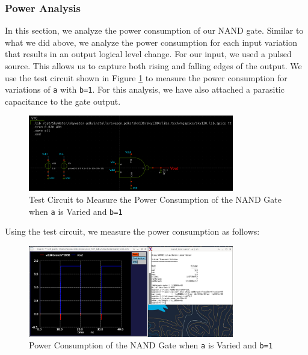 \documentclass[fleqn]{article}
\begin{document}
	\subsubsection{Power Analysis}
	
	In this section, we analyze the power consumption of our NAND gate. Similar to what we did above, we analyze the power consumption for each input variation that results in an output logical level change. For our input, we used a pulsed source. This allows us to capture both rising and falling edges of the output. We use the test circuit shown in Figure \ref{fig::nand_power_test_sweep_va} to measure the power consumption for variations of \texttt{a} with \texttt{b=1}. For this analysis, we have also attached a parasitic capacitance to the gate output.
	
	\begin{figure}[H]
		\centerline{\includegraphics[width=0.8\textwidth]{nand_power_test_sweep_va.png}}
		\caption{Test Circuit to Measure the Power Consumption of the NAND Gate when \texttt{a} is Varied and \texttt{b=1}}
		\label{fig::nand_power_test_sweep_va}
	\end{figure}
	
	\noindent Using the test circuit, we measure the power consumption as follows:
	
	\begin{figure}[H]
		\centerline{\includegraphics[width=0.8\textwidth]{nand_power_sweep_va.png}}
		\caption{Power Consumption of the NAND Gate when \texttt{a} is Varied and \texttt{b=1}}
		\label{fig::nand_power_sweep_va}
	\end{figure}
	
\end{document}
